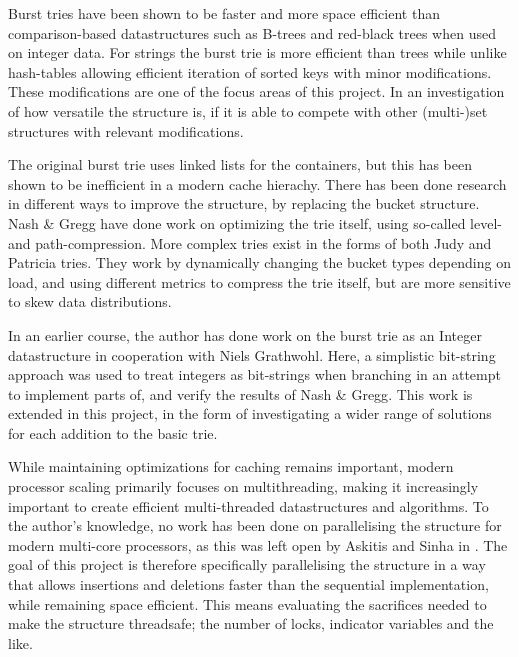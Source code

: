 Burst tries have been shown to be faster and more space efficient than
compari\-son-based datastructures such as B-trees and red-black trees when used
on integer data\cite{Nash:2008}. For strings the burst trie is more efficient
than trees\cite{Heinz:2002} while unlike hash-tables allowing efficient iteration
of sorted keys with minor modifications. These modifications are one of the
focus areas of this project. In an investigation of how versatile the structure
is, if it is able to compete with other {\keyword (multi-)set} structures with
relevant modifications.

The original burst trie uses linked lists for the containers, but this has been
shown to be inefficient in a modern cache hierachy. There has been done research
in different ways to improve the structure, by replacing the bucket structure.
Nash \& Gregg have done work on optimizing the trie itself, using so-called
level- and path-compression\cite{Nash:2008}. More complex tries exist in
the forms of both Judy and Patricia tries. They work by dynamically changing
the bucket types depending on load, and using different metrics to compress
the trie itself, but are more sensitive to skew data distributions.

In an earlier course, the author has done work on the burst trie as an Integer
datastructure\cite{Wejendorp:2010} in cooperation with Niels Grathwohl. Here, a
simplistic bit-string approach was used to treat integers as bit-strings when
branching in an attempt to implement parts of, and verify the results of Nash
\& Gregg\cite{Nash:2008}. This work is extended in this project, in the form of
investigating a wider range of solutions for each addition to the basic trie.

While maintaining optimizations for caching remains important, modern processor
scaling primarily focuses on multithreading, making it increasingly important
to create efficient multi-threaded datastructures and algorithms. To the
author's knowledge, no work has been done on parallelising the structure for
modern multi-core processors, as this was left open by Askitis and Sinha in
\cite{Askitis:2010}. The goal of this project is therefore specifically
parallelising the structure in a way that allows insertions and deletions
faster than the sequential implementation, while remaining space
efficient\cite{Askitis:2010}. This means evaluating the sacrifices needed to
make the structure threadsafe; the number of locks, indicator variables and the
like.

